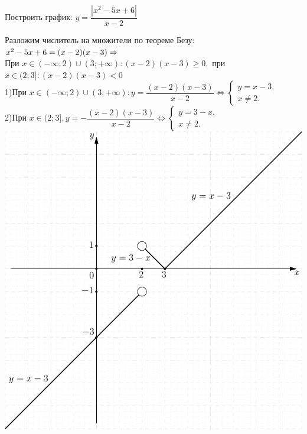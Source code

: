  Построить график: $y=\dfrac{|x^2-5x+6|}{x-2}$\\
\begin{center}
Разложим числитель на множители по теореме Безу:
$x^2-5x+6=(x-2)(x-3) \hm\Rightarrow$\\
При $ x \in (-\infty; 2)\cup (3; +\infty): (x-2)(x-3)\geqslant 0,$ при $ x \in (2;3]: (x-2)(x-3)<0 $\\
1)При $x \in (-\infty; 2)\cup (3; +\infty): y=\dfrac{(x-2)(x-3)}{x-2} \Leftrightarrow \left\{
\begin{array}{l}
y=x-3,\\
x\neq2.
\end{array} 
\right. $\\
2)При $x \in (2;3], y=-\dfrac{(x-2)(x-3)}{x-2}\Leftrightarrow \left\{
\begin{array}{l}
y=3-x,\\
x\neq2.
\end{array} \right.$\\
 \includegraphics[scale =1]{graphic.pdf}
\end{center}